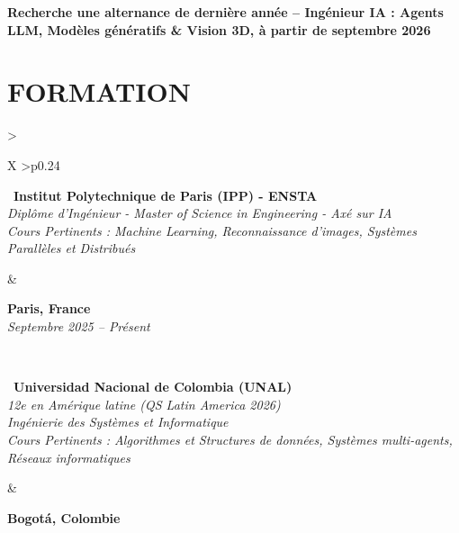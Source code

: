 \documentclass[letterpaper,10pt]{article}
\begin{document}
\vspace{0.05cm}

\textbf{Recherche une alternance de dernière année -- Ingénieur IA : Agents LLM, Modèles génératifs \& Vision 3D, à partir de septembre 2026}


\vspace{0pt}

\section{\textcolor{mydarkgreen}{\textbf{FORMATION}}}

\begin{tabularx}{\textwidth}{>{\raggedright\arraybackslash}X >{\raggedleft\arraybackslash}p{0.24\textwidth}}
  \begin{minipage}[t]{\linewidth}\raggedright
  \textbullet\ \textbf{Institut Polytechnique de Paris (IPP) - ENSTA}\\
  \textit{\footnotesize Diplôme d'Ingénieur - Master of Science in Engineering - Axé sur IA}\\
  \textit{\footnotesize Cours Pertinents : Machine Learning, Reconnaissance d'images, Systèmes Parallèles et Distribués}
  \end{minipage}
  &
  \begin{minipage}[t]{\linewidth}\raggedleft
  \textbf{Paris, France}\\
  {\footnotesize\textit{Septembre 2025 -- Présent}}
  \end{minipage}
  \\
  \begin{minipage}[t]{\linewidth}
  \textbullet\ \textbf{Universidad Nacional de Colombia (UNAL)}\\
  \textit{\footnotesize 12e en Amérique latine (QS Latin America 2026)}\\
  \textit{\footnotesize Ingénierie des Systèmes et Informatique}\\
  \textit{\footnotesize Cours Pertinents : Algorithmes et Structures de données, Systèmes multi-agents, Réseaux informatiques}
  \end{minipage}
  &
  \begin{minipage}[t]{\linewidth}\raggedleft
  \textbf{Bogotá, Colombie}\\

\end{minipage}
\end{tabularx}
\end{document}
